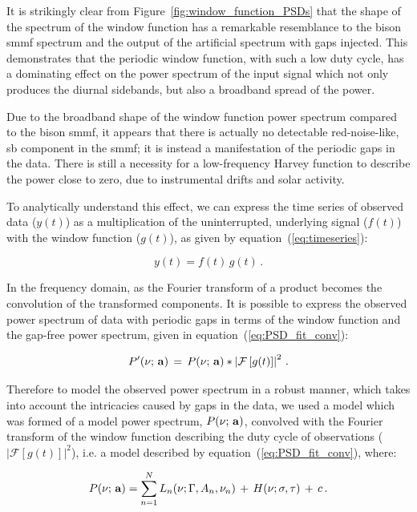 It is strikingly clear from Figure~\ref{fig:window_function_PSDs} that the shape of the spectrum of the window function has a remarkable resemblance to the \gls{bison} \gls{smmf} spectrum and the output of the artificial spectrum with gaps injected. This demonstrates that the periodic window function, with such a low duty cycle, has a dominating effect on the power spectrum of the input signal which not only produces the diurnal sidebands, but also a broadband spread of the power.

Due to the broadband shape of the window function power spectrum compared to the \gls{bison} \gls{smmf}, it appears that there is actually no detectable red-noise-like, \gls{sb} component in the \gls{smmf}; it is instead a manifestation of the periodic gaps in the data. There is still a necessity for a low-frequency Harvey function to describe the power close to zero, due to instrumental drifts and solar activity.

To analytically understand this effect, we can express the time series of observed data ($y(t)$) as a multiplication of the uninterrupted, underlying signal ($f(t)$) with the window function ($g(t)$), as given by equation~(\ref{eq:timeseries}):

\begin{equation}
y(t)  = f(t) \, g(t)
\label{eq:timeseries} \, .
\end{equation}

In the frequency domain, as the Fourier transform of a product becomes the convolution of the transformed components. It is possible to express the observed power spectrum of data with periodic gaps in terms of the window function and the gap-free power spectrum, given in equation~(\ref{eq:PSD_fit_conv}):

\begin{equation}
P'(\nu; \,{\bf a}) \, = \, P(\nu; \,{\bf a}) * \left|\mathcal{F}\left[g(t)\right]\right|^2 \, .
\label{eq:PSD_fit_conv}
\end{equation}

Therefore to model the observed power spectrum in a robust manner, which takes into account the intricacies caused by gaps in the data, we used a model which was formed of a model power spectrum, $P(\nu; \,{\bf a})$, convolved with the Fourier transform of the window function describing the duty cycle of observations ($\left|\mathcal{F}\left[g(t)\right]\right|^2$), i.e. a model described by equation~(\ref{eq:PSD_fit_conv}), where:


\begin{equation}
P(\nu; \,{\bf a}) = \sum_{n=1}^{N} L_n(\nu; \Gamma, A_n, \nu_n) \, + \, H(\nu; \sigma, \tau) \, + \, c \, .
\label{eq:PSD_model}
\end{equation}

